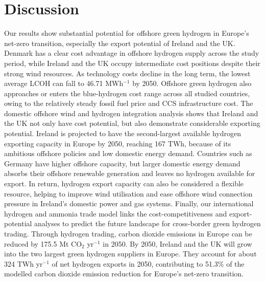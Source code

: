 \documentclass[pdflatex,sn-mathphys,Numbered]{sn-jnl}%
\begin{document}
\section{Discussion}
Our results show substantial potential for offshore green hydrogen in Europe's net-zero transition, especially the export potential of Ireland and the UK.
Denmark has a clear cost advantage in offshore hydrogen supply across the study period, while Ireland and the UK occupy intermediate cost positions despite their strong wind resources.
As technology costs decline in the long term, the lowest average LCOH can fall to 46.71 \texteuro{} MWh$^{-1}$ by 2050. Offshore green hydrogen also approaches or enters the blue-hydrogen cost range across all studied countries, owing to the relatively steady fossil fuel price and CCS infrastructure cost.
The domestic offshore wind and hydrogen integration analysis shows that Ireland and the UK not only have cost potential, but also demonstrate considerable exporting potential. Ireland is projected to have the second-largest available hydrogen exporting capacity in Europe by 2050, reaching 167 TWh, because of its ambitious offshore policies and low domestic energy demand. Countries such as Germany have higher offshore capacity, but larger domestic energy demand absorbs their offshore renewable generation and leaves no hydrogen available for export. In return, hydrogen export capacity can also be considered a flexible resource, helping to improve wind utilisation and ease offshore wind connection pressure in Ireland's domestic power and gas systems.
Finally, our international hydrogen and ammonia trade model links the cost-competitiveness and export-potential analyses to predict the future landscape for cross-border green hydrogen trading. Through hydrogen trading, carbon dioxide emissions in Europe can be reduced by 175.5 Mt CO$_2$ yr$^{-1}$ in 2050.
By 2050, Ireland and the UK will grow into the two largest green hydrogen suppliers in Europe. They account for about 324 TWh yr$^{-1}$ of net hydrogen exports in 2050, contributing to 51.3\% of the modelled carbon dioxide emission reduction for Europe's net-zero transition.
\end{document}

